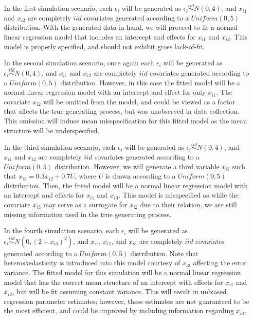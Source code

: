 \documentclass[submit]{smj}
\begin{document}
In the first simulation scenario, each $\epsilon_i$ will be generated as $\epsilon_i \stackrel{iid}{\sim} N(0,4)$, and $x_{i1}$ and $x_{i2}$ are completely $iid$ covariates generated according to
a $Uniform(0,5)$ distribution. With the generated data in hand, we will proceed to fit a normal linear regression model that includes an intercept and effects for $x_{i1}$ and $x_{i2}$. This model
is properly specified, and should not exhibit gross lack-of-fit.

In the second simulation scenario, once again each $\epsilon_i$ will be generated as $\epsilon_i \stackrel{iid}{\sim} N(0,4)$, and $x_{i1}$ and $x_{i2}$ are completely $iid$ covariates generated according to
a $Uniform(0,5)$ distribution. However, in this case the fitted model will be a normal linear regression model with an intercept and effect for only
$x_{i1}$. The covariate $x_{i2}$ will be omitted from the model, and could be viewed as a factor that affects the true generating process, but
was unobserved in data collection. This omission will induce mean misspecification for this fitted model as the mean structure will be underspecified.

In the third simulation scenario, each $\epsilon_i$ will be generated as $\epsilon_i \stackrel{iid}{\sim} N(0,4)$, and $x_{i1}$ and $x_{i2}$ are completely $iid$ covariates generated according to
a $Uniform(0,5)$ distribution. However, we will generate a third variable $x_{i3}$ such that $x_{i3} = 0.3 x_{i2} + 0.7 U$, where $U$ is drawn according to a $Uniform(0,5)$ distribution.
Then, the fitted model will be a normal linear regression model with an intercept and effects for $x_{i1}$ and $x_{i3}$. This model is misspecified as while the covariate $x_{i3}$ 
may serve as a surrogate for $x_{i2}$ due to their relation, we are still missing information used in the true generating process.

In the fourth simulation scenario, each $\epsilon_i$ will be generated as $\epsilon_i \stackrel{iid}{\sim} N \left( 0,(2 + x_{i3})^2 \right)$, and $x_{i1}$, $x_{i2}$, and $x_{i3}$ are completely $iid$ covariates
generated according to a $Uniform(0,5)$ distribution. Note that heteroskedasticity is introduced into this model courtesy of $x_{i3}$ affecting the error variance. The fitted model for
this simulation will be a normal linear regression model that has the correct mean structure of an intercept with effects for $x_{i1}$ and $x_{i2}$, but will be fit assuming constant variance.
This will result in unbiased regression parameter estimates; however, these estimates are not guaranteed to be the most efficient, and could be improved by including information regarding $x_{i3}$.
\end{document}
